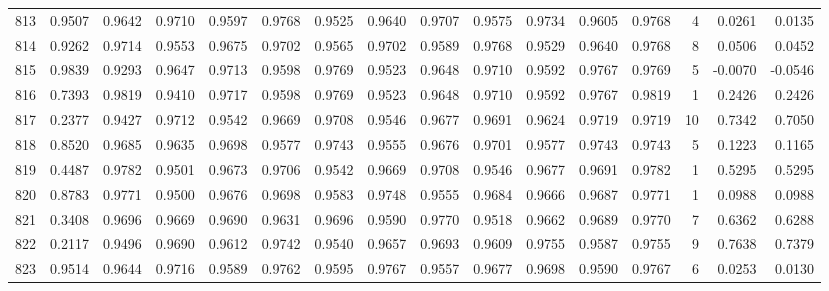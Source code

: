 \begin{tabular}{lrrrrrrrrrrrrrrr}
813 &      0.9507 &  0.9642 &  0.9710 &  0.9597 &  0.9768 &  0.9525 &  0.9640 &  0.9707 &  0.9575 &  0.9734 &   0.9605 &     0.9768 &      4 &                    0.0261 &                     0.0135 \\
814 &      0.9262 &  0.9714 &  0.9553 &  0.9675 &  0.9702 &  0.9565 &  0.9702 &  0.9589 &  0.9768 &  0.9529 &   0.9640 &     0.9768 &      8 &                    0.0506 &                     0.0452 \\
815 &      0.9839 &  0.9293 &  0.9647 &  0.9713 &  0.9598 &  0.9769 &  0.9523 &  0.9648 &  0.9710 &  0.9592 &   0.9767 &     0.9769 &      5 &                   -0.0070 &                    -0.0546 \\
816 &      0.7393 &  0.9819 &  0.9410 &  0.9717 &  0.9598 &  0.9769 &  0.9523 &  0.9648 &  0.9710 &  0.9592 &   0.9767 &     0.9819 &      1 &                    0.2426 &                     0.2426 \\
817 &      0.2377 &  0.9427 &  0.9712 &  0.9542 &  0.9669 &  0.9708 &  0.9546 &  0.9677 &  0.9691 &  0.9624 &   0.9719 &     0.9719 &     10 &                    0.7342 &                     0.7050 \\
818 &      0.8520 &  0.9685 &  0.9635 &  0.9698 &  0.9577 &  0.9743 &  0.9555 &  0.9676 &  0.9701 &  0.9577 &   0.9743 &     0.9743 &      5 &                    0.1223 &                     0.1165 \\
819 &      0.4487 &  0.9782 &  0.9501 &  0.9673 &  0.9706 &  0.9542 &  0.9669 &  0.9708 &  0.9546 &  0.9677 &   0.9691 &     0.9782 &      1 &                    0.5295 &                     0.5295 \\
820 &      0.8783 &  0.9771 &  0.9500 &  0.9676 &  0.9698 &  0.9583 &  0.9748 &  0.9555 &  0.9684 &  0.9666 &   0.9687 &     0.9771 &      1 &                    0.0988 &                     0.0988 \\
821 &      0.3408 &  0.9696 &  0.9669 &  0.9690 &  0.9631 &  0.9696 &  0.9590 &  0.9770 &  0.9518 &  0.9662 &   0.9689 &     0.9770 &      7 &                    0.6362 &                     0.6288 \\
822 &      0.2117 &  0.9496 &  0.9690 &  0.9612 &  0.9742 &  0.9540 &  0.9657 &  0.9693 &  0.9609 &  0.9755 &   0.9587 &     0.9755 &      9 &                    0.7638 &                     0.7379 \\
823 &      0.9514 &  0.9644 &  0.9716 &  0.9589 &  0.9762 &  0.9595 &  0.9767 &  0.9557 &  0.9677 &  0.9698 &   0.9590 &     0.9767 &      6 &                    0.0253 &                     0.0130 \\

\end{tabular}
